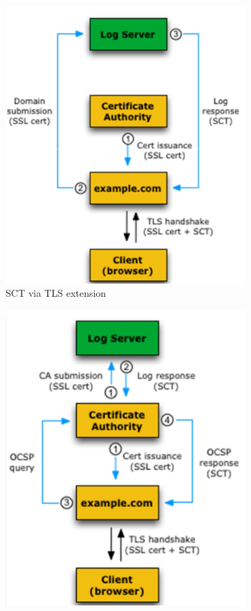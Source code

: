 \begin{figure}[H]
\begin{subfigure}[b]{0.3\textwidth}
    \includegraphics[width=\textwidth]{img/x509 sct tls.png}
    \caption{SCT via TLS extension}
    \label{fig:ct tls}
  \end{subfigure}
  \hfill
  \begin{subfigure}[b]{0.3\textwidth}
    \includegraphics[width=\textwidth]{img/x509 sct oscp.png}

\end{subfigure}
\end{figure}
